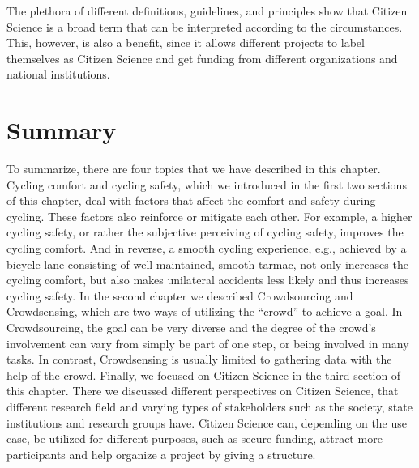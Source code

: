 The plethora of different definitions, guidelines, and principles show that Citizen Science is a broad term that can be interpreted according to the circumstances.
This, however, is also a benefit, since it allows different projects to label themselves as Citizen Science and get funding from different organizations and national institutions.

\section{Summary}
\label{sec:summary_background}
To summarize, there are four topics that we have described in this chapter.
Cycling comfort and cycling safety, which we introduced in the first two sections of this chapter, deal with factors that affect the comfort and safety during cycling.
These factors also reinforce or mitigate each other.
For example, a higher cycling safety, or rather the subjective perceiving of cycling safety, improves the cycling comfort.
And in reverse, a smooth cycling experience, e.g., achieved by a bicycle lane consisting of well-maintained, smooth tarmac, not only increases the cycling comfort, but also makes unilateral accidents less likely and thus increases cycling safety.
In the second chapter we described Crowdsourcing and Crowdsensing, which are two ways of utilizing the ``crowd'' to achieve a goal.
In Crowdsourcing, the goal can be very diverse and the degree of the crowd's involvement can vary from simply be part of one step, or being involved in many tasks.
In contrast, Crowdsensing is usually limited to gathering data with the help of the crowd.
Finally, we focused on Citizen Science in the third section of this chapter.
There we discussed different perspectives on Citizen Science, that different research field and varying types of stakeholders such as the society, state institutions and research groups have.
Citizen Science can, depending on the use case, be utilized for different purposes, such as secure funding, attract more participants and help organize a project by giving a structure.

